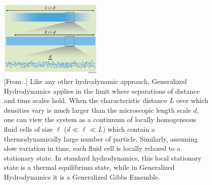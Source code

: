 \documentclass[onecolumn,amsfonts,showpacs,superscriptaddress]{revtex4-1}
\begin{document}
\begin{figure}[ht]
    \centering
    \includegraphics[width=0.45\textwidth]{figures/separation_of_scales.png}
    \caption{[From \citep{dubail2016more}.] Like any other hydrodynamic approach, Generalized Hydrodynamics applies in the limit where separations of distance and time scales hold. When the characteristic distance $L$ over which densities vary is much larger than the microscopic length scale $d$, one can view the system as a continuum of locally homogeneous fluid cells of size $\ell$ ($d \ll \ell \ll L$) which contain a thermodynamically large number of particle. Similarly, assuming slow variation in time, each fluid cell is locally relaxed to a stationary state. In standard hydrodynamics, this local stationary state is a thermal equilibrium state, while in Generalized Hydrodynamics it is a Generalized Gibbs Ensemble.}
    \label{fig:sos}
\end{figure}
\end{document}
